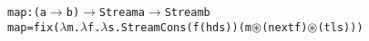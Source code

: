 \begin{alltt}
map : (a \(\rightarrow\) b) \(\rightarrow\) Stream a \(\rightarrow\) Stream b
map = fix(\(\lambda\)m.\(\lambda\)f.\(\lambda\)s. StreamCons (f (hd s)) (m \(\circledast\) (next f) \(\circledast\) (tl s)))
\end{alltt}
